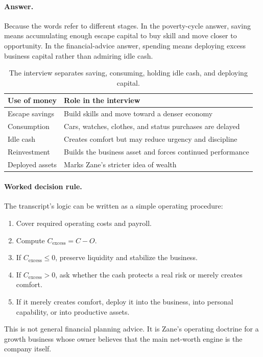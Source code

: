 \paragraph{Answer.}
Because the words refer to different stages. In the poverty-cycle answer, saving means accumulating enough escape capital to buy skill and move closer to opportunity. In the financial-advice answer, spending means deploying excess business capital rather than admiring idle cash.

\begin{table}
\centering
\begin{tabular}{p{.34\linewidth}p{.52\linewidth}}
\hline
Use of money & Role in the interview\\
\hline
Escape savings & Build skills and move toward a denser economy\\
Consumption & Cars, watches, clothes, and status purchases are delayed\\
Idle cash & Creates comfort but may reduce urgency and discipline\\
Reinvestment & Builds the business asset and forces continued performance\\
Deployed assets & Marks Zane's stricter idea of wealth\\
\hline
\end{tabular}
\caption{The interview separates saving, consuming, holding idle cash, and deploying capital.}
\end{table}

\paragraph{Worked decision rule.}
The transcript's logic can be written as a simple operating procedure:
\begin{enumerate}
\item Cover required operating costs and payroll.
\item Compute \(C_{\mathrm{excess}}=C-O\).
\item If \(C_{\mathrm{excess}}\leq 0\), preserve liquidity and stabilize the business.
\item If \(C_{\mathrm{excess}}>0\), ask whether the cash protects a real risk or merely creates comfort.
\item If it merely creates comfort, deploy it into the business, into personal capability, or into productive assets.
\end{enumerate}

This is not general financial planning advice. It is Zane's operating doctrine for a growth business whose owner believes that the main net-worth engine is the company itself.

